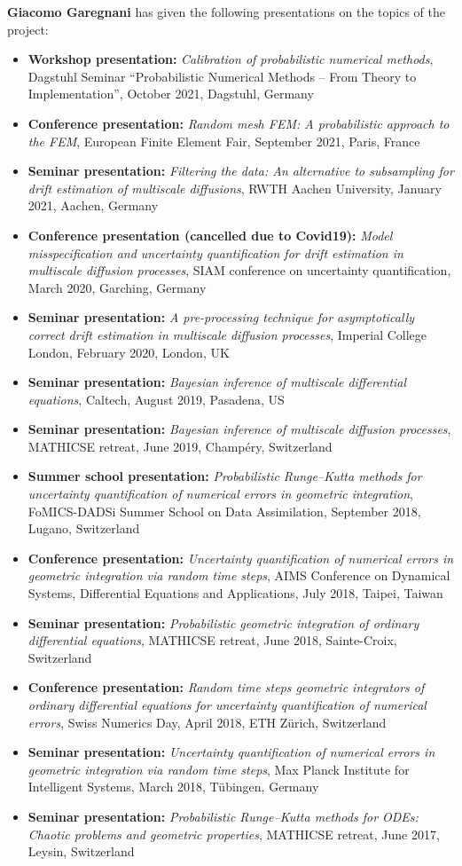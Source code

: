 \documentclass[10pt]{article}
\begin{document}
\textbf{Giacomo Garegnani} has given the following presentations on the topics of the project:
\begin{itemize}
	\item \textbf{Workshop presentation:} \textit{Calibration of probabilistic numerical methods}, Dagstuhl Seminar ``Probabilistic Numerical Methods -- From Theory to Implementation'', October 2021, Dagstuhl, Germany
	\item \textbf{Conference presentation:} \textit{Random mesh FEM: A probabilistic approach to the FEM}, European Finite Element Fair, September 2021, Paris, France
	\item \textbf{Seminar presentation:} \textit{Filtering the data: An alternative to subsampling for drift estimation of multiscale diffusions}, RWTH Aachen University, January 2021, Aachen, Germany
	\item \textbf{Conference presentation (cancelled due to Covid19):} \textit{Model misspecification and uncertainty quantification for drift estimation in multiscale diffusion processes}, SIAM conference on uncertainty quantification, March 2020, Garching, Germany
	\item \textbf{Seminar presentation:} \textit{A pre-processing technique for asymptotically correct drift estimation in multiscale diffusion processes}, Imperial College London, February 2020, London, UK
	\item \textbf{Seminar presentation:} \textit{Bayesian inference of multiscale differential equations}, Caltech, August 2019, Pasadena, US
	\item \textbf{Seminar presentation:} \textit{Bayesian inference of multiscale diffusion processes}, MATHICSE retreat, June 2019, Champéry, Switzerland
	\item \textbf{Summer school presentation:} \textit{Probabilistic Runge--Kutta methods	for uncertainty quantification of numerical errors in geometric integration}, FoMICS-DADSi Summer School on Data Assimilation, September 2018,  Lugano, Switzerland
	\item \textbf{Conference presentation:} \textit{Uncertainty quantification of numerical errors in geometric integration via random time steps}, AIMS Conference on Dynamical Systems, Differential Equations and Applications, July 2018, Taipei, Taiwan
	\item \textbf{Seminar presentation:} \textit{Probabilistic geometric integration of ordinary differential equations}, MATHICSE retreat, June 2018, Sainte-Croix, Switzerland
	\item \textbf{Conference presentation:} \textit{Random time steps geometric integrators of ordinary differential equations for uncertainty quantification of numerical errors}, Swiss Numerics Day, April 2018, ETH Zürich, Switzerland
	\item \textbf{Seminar presentation:} \textit{Uncertainty quantification of numerical errors in geometric integration via random time steps}, Max Planck Institute for Intelligent Systems, March 2018, Tübingen, Germany 
	\item \textbf{Seminar presentation:} \textit{Probabilistic Runge--Kutta methods for ODEs: Chaotic problems and geometric properties}, MATHICSE retreat, June 2017, Leysin, Switzerland
\end{itemize}
\end{document}
